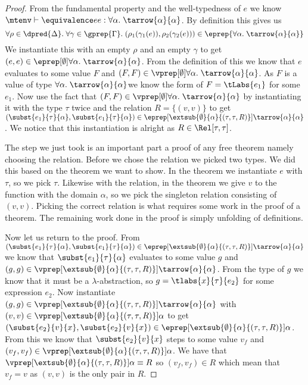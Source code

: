 \begin{proof}
\newcommand{\aaa}{\ensuremath{\forall \alpha. \; \tarrow{\alpha}{\alpha}}}
From the fundamental property and the well-typedness of $e$ we know $\mtenv \vdash \lreq{e}{e} : \aaa$. By definition this gives us
\[
\forall \rho \in \dpred{\Delta}. \; \forall \gamma \in \gprep{\Gamma}. \; (\rho_1(\gamma_1(e)),\rho_2(\gamma_2(e))) \in \eprep{\aaa}
\]
\newcommand{\mt}{\ensuremath{\emptyset}}
We instantiate this with an empty $\rho$ and an empty $\gamma$ to get $(e,e) \in \eprep[\mt]{\aaa}$. From the definition of this we know that $e$ evaluates to some value $F$ and $(F,F) \in \vprep[\mt]{\aaa}$. As $F$ is a value of type \aaa we know the form of $F=\tLabs{e_1}$ for some $e_1$. Now use the fact that $(F,F) \in \vprep[\mt]{\aaa}$ by instantiating it with the type $\tau$ twice and the relation $R=\{(v,v)\}$ to get 
\newcommand{\env}{\ensuremath{\extsub{\mt}{\alpha}{(\tau,\tau,R)}}}
\newcommand{\taa}{\ensuremath{\tarrow{\alpha}{\alpha}}}
$(\subst{e_1}{\tau}{\alpha},\subst{e_1}{\tau}{\alpha})\in \eprep[\env]{\taa}$. We notice that this instantiation is alright as $R \in \Rel[\tau,\tau]$.

The step we just took is an important part a proof of any free theorem namely choosing the relation. Before we chose the relation we picked two types. We did this based on the theorem we want to show. In the theorem we instantiate $e$ with $\tau$, so we pick $\tau$. Likewise with the relation, in the theorem we give $v$ to the function with the domain $\alpha$, so we pick the singleton relation consisting of $(v,v)$. Picking the correct relation is what requires some work in the proof of a theorem. The remaining work done in the proof is simply unfolding of definitions.

Now let us return to the proof. From $(\subst{e_1}{\tau}{\alpha},\subst{e_1}{\tau}{\alpha})\in \eprep[\env]{\taa}$ we know that $\subst{e_1}{\tau}{\alpha}$ evaluates to some value $g$ and $(g,g)\in \vprep[\env]{\taa}$. From the type of $g$ we know that it must be a $\lambda$-abstraction, so $g=\tlabs{x}{\tau}{e_2}$ for some expression $e_2$. Now instantiate $(g,g)\in \vprep[\env]{\taa}$ with $(v,v) \in \vprep[\env]{\alpha}$ to get $(\subst{e_2}{v}{x},\subst{e_2}{v}{x}) \in \eprep[\env]{\alpha}$. From this we know that $\subst{e_2}{v}{x}$ steps to some value $v_f$ and $(v_f,v_f) \in \vprep[\env]{\alpha}$. We have that $\vprep[\env]{\alpha} \equiv R$ so $(v_f,v_f) \in R$ which mean that $v_f = v$ as $(v,v)$ is the only pair in $R$.


\end{proof}
